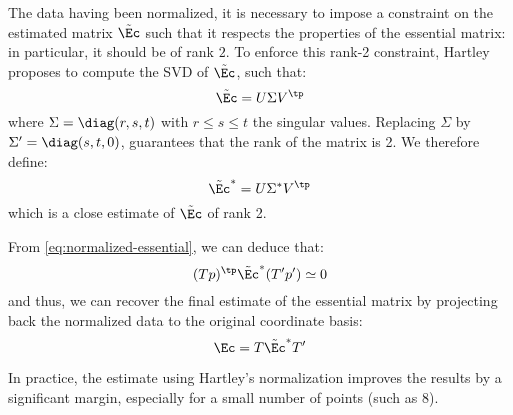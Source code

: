 The data having been normalized, it is necessary to impose a constraint on the estimated matrix $\tilde{\Ec}$ such that it respects the properties of the essential matrix: in particular, it should be of rank $2$. To enforce this rank-2 constraint, Hartley proposes to compute the SVD of $\tilde{\Ec}$, such that:
\begin{equation*}
    \tilde{\Ec} = U\Sigma V^\tp
\end{equation*}
where $\Sigma=\diag(r,s,t)$ with $r\leq s\leq t$ the singular values. Replacing $\Sigma$ by $\Sigma'=\diag(s,t,0)$, guarantees that the rank of the matrix is 2. We therefore define:
\begin{equation*}
    \tilde{\Ec}^* = U\Sigma^* V^\tp
\end{equation*}
which is a close estimate of $\tilde{\Ec}$ of rank 2.

From \autoref{eq:normalized-essential}, we can deduce that:
\begin{equation*}
    (Tp)^\tp\tilde{\Ec}^*(T'p')\simeq0
\end{equation*}
and thus, we can recover the final estimate of the essential matrix by projecting back the normalized data to the original coordinate basis:
\begin{equation*}
    \Ec = T\tilde{\Ec}^*T'
\end{equation*}

In practice, the estimate using Hartley's normalization improves the results by a significant margin, especially for a small number of points (such as 8).